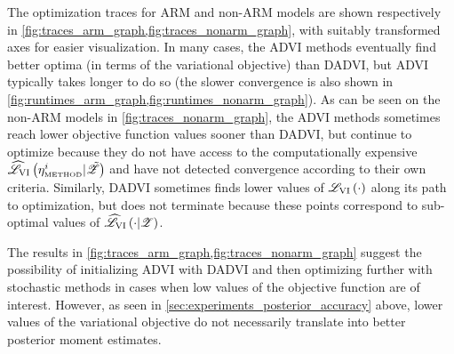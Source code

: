The optimization traces for ARM and non-ARM models are shown respectively in
\cref{fig:traces_arm_graph,fig:traces_nonarm_graph}, with suitably transformed
axes for easier visualization.  In many cases, the ADVI methods
eventually find better optima (in terms of the variational objective) than
DADVI, but ADVI typically takes longer to do so (the slower
convergence is also shown in
\cref{fig:runtimes_arm_graph,fig:runtimes_nonarm_graph}).  As can be seen on the
non-ARM models in \cref{fig:traces_nonarm_graph}, the ADVI methods
sometimes reach lower objective function values sooner than DADVI, but continue
to optimize because they do not have access to the computationally expensive
$\widehat{\mathscr{L}}_{\mathrm{VI}}\left(\eta^{i}_{\textrm{\tiny METHOD}} \vert \tilde{\mathscr{Z}}\right)$ and have not detected convergence
according to their own criteria.  Similarly, DADVI sometimes finds lower values
of $\mathscr{L}_{\mathrm{VI}}\left(\cdot\right)$ along its path to optimization, but does not terminate
because these points correspond to sub-optimal values of $\widehat{\mathscr{L}}_{\mathrm{VI}}\left(\cdot \vert
\mathscr{Z}\right)$.

The results in \cref{fig:traces_arm_graph,fig:traces_nonarm_graph} suggest the
possibility of initializing ADVI with DADVI and then optimizing further with
stochastic methods in cases when low values of the objective function are of
interest.  However, as seen in \cref{sec:experiments_posterior_accuracy} above,
lower values of the variational objective do not necessarily translate into
better posterior moment estimates.
